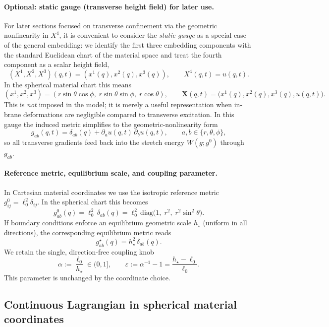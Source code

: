 \documentclass[11pt,a4paper]{article}
\newcommand{\X}{\mathbf{X}}                 %
\begin{document}
\paragraph{Optional: static gauge (transverse height field) for later use.}
For later sections focused on transverse confinement via the geometric nonlinearity in \(X^4\),
it is convenient to consider the \emph{static gauge} as a special case of the general embedding:
we identify the first three embedding components with the standard Euclidean chart of the
material space and treat the fourth component as a scalar height field,
\[
(X^1,X^2,X^3)(q,t) = (x^1(q),x^2(q),x^3(q)),
\qquad
X^4(q,t)=u(q,t).
\]
In the spherical material chart this means
\[
(x^1,x^2,x^3)=(r\sin\theta\cos\phi,\; r\sin\theta\sin\phi,\; r\cos\theta),
\qquad
\X(q,t)=\big(x^1(q),x^2(q),x^3(q),u(q,t)\big).
\]
This is \emph{not} imposed in the model; it is merely a useful representation when in-brane
deformations are negligible compared to transverse excitation. In this gauge the induced metric
simplifies to the geometric-nonlinearity form
\[
g_{ab}(q,t)=\delta_{ab}(q) + \partial_a u(q,t)\,\partial_b u(q,t),
\qquad a,b\in\{r,\theta,\phi\},
\]
so all transverse gradients feed back into the stretch energy \(W(g;g^0)\) through \(g_{ab}\).

\paragraph{Reference metric, equilibrium scale, and coupling parameter.}
In Cartesian material coordinates we use the isotropic reference metric
\(g^0_{ij}=\ell_0^2\delta_{ij}\). In the spherical chart this becomes
\[
g^0_{ab}(q)=\ell_0^2\,\delta_{ab}(q)
=\ell_0^2\,\mathrm{diag}\!\big(1,\; r^2,\; r^2\sin^2\theta\big).
\]
If boundary conditions enforce an equilibrium geometric scale \(h_\star\) (uniform in all
directions), the corresponding equilibrium metric reads
\[
g^\star_{ab}(q)=h_\star^2\,\delta_{ab}(q).
\]
We retain the single, direction-free coupling knob
\[
\alpha := \frac{\ell_0}{h_\star}\in(0,1],
\qquad
\varepsilon := \alpha^{-1}-1=\frac{h_\star-\ell_0}{\ell_0}.
\]
This parameter is unchanged by the coordinate choice.

\subsection{Continuous Lagrangian in spherical material coordinates}
\label{subsec:continuous_lagrangian_spherical}
\end{document}
